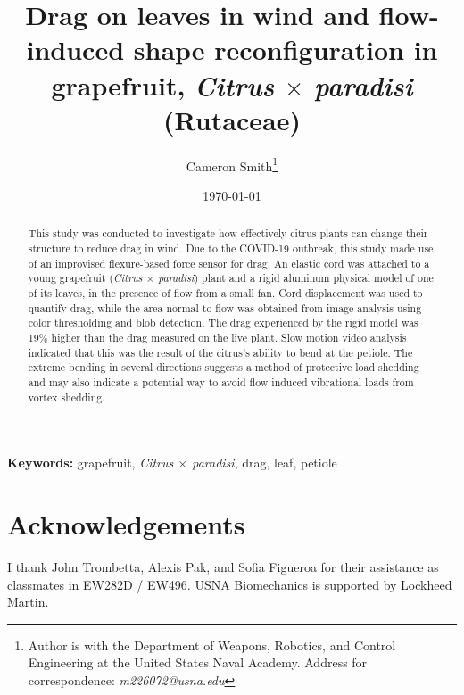 \documentclass[10pt]{article}
\title{Drag on leaves in wind and flow-induced shape reconfiguration in grapefruit, {\emph{Citrus $\times$ paradisi}} (Rutaceae)}
\author{Cameron Smith\thanks{Author is with the Department of Weapons, Robotics, and Control Engineering at the United States Naval Academy. Address for correspondence: \emph{m226072@usna.edu}}}
\date{\today}
\newcommand{\Citrusxparadisi}{\emph{Citrus $\times$ paradisi}}
\begin{document}
\maketitle
\begin{abstract}
This study was conducted to investigate how effectively citrus plants can change their structure to reduce drag in wind. Due to the COVID-19 outbreak, this study made use of an improvised flexure-based force sensor for drag. An elastic cord was attached to a young grapefruit (\Citrusxparadisi) plant and a rigid aluminum physical model of one of its leaves, in the presence of flow from a small fan.  Cord displacement was used to quantify drag, while the area normal to flow was obtained from image analysis using color thresholding and blob detection. The drag experienced by the rigid model was 19\% higher than the drag measured on the live plant. Slow motion video analysis indicated that this was the result of the citrus's ability to bend at the petiole. The extreme bending in several directions suggests a method of protective load shedding and may also indicate a potential way to avoid flow induced vibrational loads from vortex shedding.
\end{abstract}
{\scriptsize\textbf{Keywords: }grapefruit, \Citrusxparadisi, drag, leaf, petiole}


\section{Acknowledgements}
I thank John Trombetta, Alexis Pak, and Sofia Figueroa for their assistance as classmates in EW282D / EW496. USNA Biomechanics is supported by Lockheed Martin. 



\clearpage
\appendix
\renewcommand{\figurename}{Supplementary Figure}
\renewcommand{\thefigure}{S\arabic{figure}}

\end{document}
